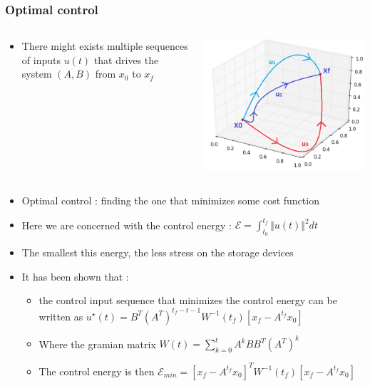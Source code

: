 \documentclass[xcolor=dvipsnames]{beamer}
\begin{document}
\begin{frame}
	\frametitle{Optimal control}
	
	\begin{columns}
		\begin{column}{.7\textwidth}
			\begin{itemize}
			\item There might exists multiple sequences of inputs $ u(t) $ that drives the system $(A,B)$ from $x_0$ to $x_f$
			\end{itemize}
		\end{column}
		\begin{column}{.3\textwidth}
			\includegraphics[scale=.3]{trajectories}
		\end{column}
	\end{columns}
	\begin{itemize}
		\item Optimal control : finding the one that minimizes some cost function
		\item Here we are concerned with the control energy : $ \mathcal{E} = \int_{t_0}^{t_f} \Vert u(t) \Vert^2 dt $
		\item The smallest this energy, the less stress on the storage devices
		\item It has been shown that :
		\begin{itemize}
			\item the control input sequence that minimizes the control energy can be written as $u^{\star}(t) =B^T(A^T)^{t_f-t-1}W^{-1}(t_f) \left[ x_f - A^{t_f}x_0 \right] $
			\item Where the gramian matrix $ W(t) = \sum_{k=0}^{t} A^kBB^T(A^T)^k $
			\item The control energy is then $ \mathcal{E}_{min}= \left[ x_f - A^{t_f}x_0 \right]^{T}W^{-1}(t_f)\left[ x_f - A^{t_f}x_0 \right] $
		\end{itemize}
	\end{itemize}
\end{frame}
\end{document}
